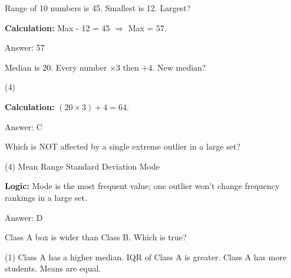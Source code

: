 \documentclass[11pt,paper=a4,answers]{exam}
\begin{document}
\begin{questions}
\vspace{60pt}

\question
Range of 10 numbers is 45. Smallest is 12. Largest?

\begin{solution}
\textbf{Calculation:} Max - 12 = 45 $\Rightarrow$ Max = 57.

\vspace{30pt}

Answer: \colorbox{yellow!100}{57}
\end{solution}

\vspace{60pt}

\question
Median is 20. Every number $\times 3$ then $+4$. New median?
\begin{tasks}(4)
\end{tasks}

\begin{solution}
\textbf{Calculation:} $(20 \times 3) + 4 = 64$.

\vspace{30pt}

Answer: \colorbox{yellow!100}{C}
\end{solution}

\vspace{60pt}

\question
Which is NOT affected by a single extreme outlier in a large set?
\begin{tasks}(4)
    \task Mean
    \task Range
    \task Standard Deviation
    \task Mode
\end{tasks}

\begin{solution}
\textbf{Logic:} Mode is the most frequent value; one outlier won't change frequency rankings in a large set.

\vspace{30pt}

Answer: \colorbox{yellow!100}{D}
\end{solution}

\vspace{60pt}

\question
Class A box is wider than Class B. Which is true?
\begin{tasks}(1)
    \task Class A has a higher median.
    \task IQR of Class A is greater.
    \task Class A has more students.
    \task Means are equal.
\end{tasks}


\end{questions}
\end{document}

